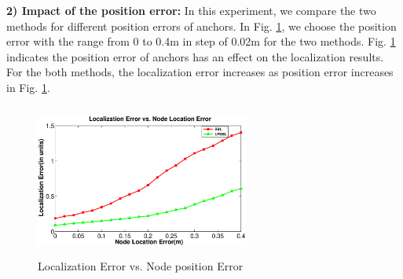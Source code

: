\textbf{2) Impact of the position error:}
 In this experiment, we compare the two methods for different position errors of anchors. 
 In Fig. \ref{fig5}, we choose the position error with the range from 0 to 0.4m in step of 0.02m for the two methods. 
 Fig. \ref{fig5} indicates the position error of anchors has an effect on the localization results. 
 For the both methods, the localization error increases as position error increases in Fig. \ref{fig5}. 
  \begin{figure}[htb]
		   \vspace{-25mm}
			 \includegraphics[height=5.0cm,width=7.0cm]{image/fig5.eps}
            \vspace{25mm}
            \caption{Localization Error vs. Node position Error}
             \vspace{-5mm}
             \label{fig5}
        \end{figure}

